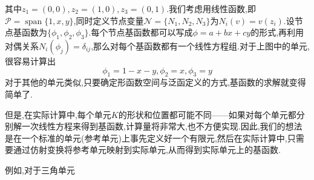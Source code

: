 \begin{center}
\end{center}
其中$z_1=(0,0),z_2=(1,0),z_3=(0,1)$.我们考虑用线性函数,即$\mathcal{P}=\operatorname{span}\{1,x,y\}$,同时定义节点变量$\mathcal{N}=\{N_1,N_2,N_3\}$为$N_i(v)=v(z_i)$.设节点基函数为$\{\phi_1,\phi_2,\phi_3\}$.每个节点基函数都可以写成$\phi=a+bx+cy$的形式,再利用对偶关系$N_i(\phi_j)=\delta_{ij}$,那么对每个基函数都有一个线性方程组.对于上图中的单元,很容易计算出
$$
\phi_1=1-x-y,\phi_2=x,\phi_3=y
$$
对于其他的单元类似,只要确定形函数空间与泛函定义的方式,基函数的求解就变得简单了.\par
但是,在实际计算中,每个单元$K$的形状和位置都可能不同——如果对每个单元都分别解一次线性方程来得到基函数,计算量将非常大,也不方便实现.因此,我们的想法是在一个标准的单元(参考单元)上事先定义好一个有限元,然后在实际计算中,只需要通过仿射变换将参考单元映射到实际单元,从而得到实际单元上的基函数.\par
例如,对于三角单元

